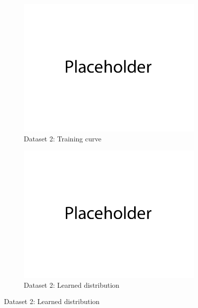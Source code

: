 \documentclass{article}
\begin{document}
\begin{enumerate}[(a)]
\begin{figure}[H]
    \centering
    \begin{subfigure}{0.45\textwidth}
        \centering
        \includegraphics[width=\textwidth]{figures/q2_a_dset2_train_plot.png}
        \caption{Dataset 2: Training curve}
    \end{subfigure}
    \hspace{0.2in}
    \begin{subfigure}{0.45\textwidth}
        \centering
        \includegraphics[width=\textwidth]{figures/q2_a_dset2_learned_dist.png}
        \caption{Dataset 2: Learned distribution}
    \end{subfigure}
\end{figure}


\end{enumerate}
\end{document}
